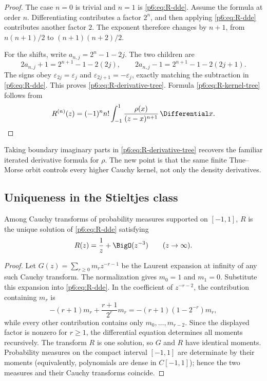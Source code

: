 \documentclass[11pt]{article}
\theoremstyle{definition}
\theoremstyle{remark}
\newcommand{\eps}{\varepsilon}
\begin{document}
\begin{proof}
The case \(n=0\) is trivial and \(n=1\) is \eqref{p6:eq:R-dde}.  Assume the formula at
order \(n\).  Differentiating contributes a factor \(2^n\), and then applying
\eqref{p6:eq:R-dde} contributes another factor \(2\).  The exponent therefore changes by
\(n+1\), from \(n(n+1)/2\) to \((n+1)(n+2)/2\).

For the shifts, write \(a_{n,j}=2^n-1-2j\).  The two children are
\[
 2a_{n,j}+1=2^{n+1}-1-2(2j),
 \qquad
 2a_{n,j}-1=2^{n+1}-1-2(2j+1).
\]
The signs obey \(\eps_{2j}=\eps_j\) and \(\eps_{2j+1}=-\eps_j\), exactly matching the
subtraction in \eqref{p6:eq:R-dde}.  This proves \eqref{p6:eq:R-derivative-tree}.  Formula
\eqref{p6:eq:R-kernel-tree} follows from
\[
 R^{(n)}(z)=(-1)^n n!\int_{-1}^{1}\frac{\rho(x)}{(z-x)^{n+1}}\,\Differential x.
\]
\end{proof}

Taking boundary imaginary parts in \eqref{p6:eq:R-derivative-tree} recovers the familiar
iterated derivative formula for \(\rho\).  The new point is that the same finite
Thue--Morse orbit controls every higher Cauchy kernel, not only the density derivatives.

\subsection{Uniqueness in the Stieltjes class}

\begin{proposition}\label{p6:prop:R-uniqueness}
Among Cauchy transforms of probability measures supported on \([-1,1]\), \(R\) is the
unique solution of \eqref{p6:eq:R-dde} satisfying
\begin{equation}
 R(z)=\frac1z+\BigO(z^{-3})\qquad(z\to\infty).               \label{p6:eq:R-normalization}
\end{equation}
\end{proposition}

\begin{proof}
Let \(G(z)=\sum_{r\ge0}m_r z^{-r-1}\) be the Laurent expansion at infinity of any such
Cauchy transform.  The normalization gives \(m_0=1\) and \(m_1=0\).  Substitute this
expansion into \eqref{p6:eq:R-dde}.  In the coefficient of \(z^{-r-2}\), the contribution
containing \(m_r\) is
\[
 -(r+1)m_r+\frac{r+1}{2^r}m_r
 =-(r+1)(1-2^{-r})m_r,
\]
while every other contribution contains only \(m_0,\ldots,m_{r-2}\).  Since the displayed
factor is nonzero for \(r\ge1\), the differential equation determines all moments
recursively.  The transform \(R\) is one solution, so \(G\) and \(R\) have identical
moments.  Probability measures on the compact interval \([-1,1]\) are determinate by their
moments (equivalently, polynomials are dense in \(C[-1,1]\)); hence the two measures and
their Cauchy transforms coincide.
\end{proof}
\end{document}
